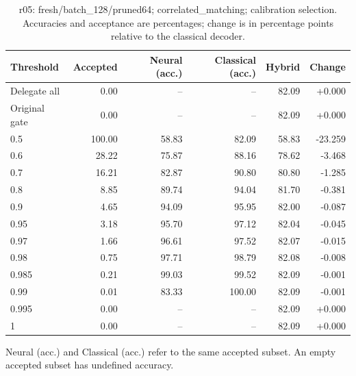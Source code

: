 \begin{table}[htbp]
\centering\small
\setlength{\tabcolsep}{3pt}
\caption{r05: fresh/batch\_128/pruned64; correlated\_matching; calibration selection. Accuracies and acceptance are percentages; change is in percentage points relative to the classical decoder.}
\begin{tabular}{lrrrrr}
\toprule
Threshold & Accepted & Neural (acc.) & Classical (acc.) & Hybrid & Change \\
\midrule
Delegate all & 0.00 & -- & -- & 82.09 & +0.000 \\
Original gate & 0.00 & -- & -- & 82.09 & +0.000 \\
0.5 & 100.00 & 58.83 & 82.09 & 58.83 & -23.259 \\
0.6 & 28.22 & 75.87 & 88.16 & 78.62 & -3.468 \\
0.7 & 16.21 & 82.87 & 90.80 & 80.80 & -1.285 \\
0.8 & 8.85 & 89.74 & 94.04 & 81.70 & -0.381 \\
0.9 & 4.65 & 94.09 & 95.95 & 82.00 & -0.087 \\
0.95 & 3.18 & 95.70 & 97.12 & 82.04 & -0.045 \\
0.97 & 1.66 & 96.61 & 97.52 & 82.07 & -0.015 \\
0.98 & 0.75 & 97.71 & 98.79 & 82.08 & -0.008 \\
0.985 & 0.21 & 99.03 & 99.52 & 82.09 & -0.001 \\
0.99 & 0.01 & 83.33 & 100.00 & 82.09 & -0.001 \\
0.995 & 0.00 & -- & -- & 82.09 & +0.000 \\
1 & 0.00 & -- & -- & 82.09 & +0.000 \\
\bottomrule
\end{tabular}
\par\smallskip\footnotesize Neural (acc.) and Classical (acc.) refer to the same accepted subset. An empty accepted subset has undefined accuracy.
\end{table}
